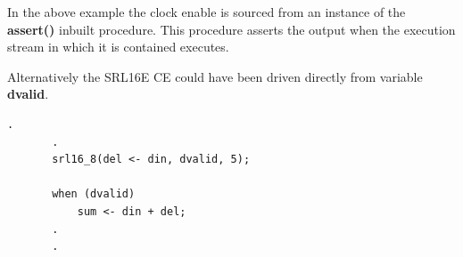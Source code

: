     In the above example the clock enable is sourced from an instance of the {\bf
    assert()}  inbuilt procedure. This procedure asserts the
    output when the execution stream in which it is contained executes.
    
    Alternatively the SRL16E CE could have been driven directly from variable
    {\bf dvalid}.
    
    \begin{lstlisting}[gobble=4, language=threepl]
       .
       .
       srl16_8(del <- din, dvalid, 5);

       when (dvalid)
           sum <- din + del;
       .
       .
    \end{lstlisting}
